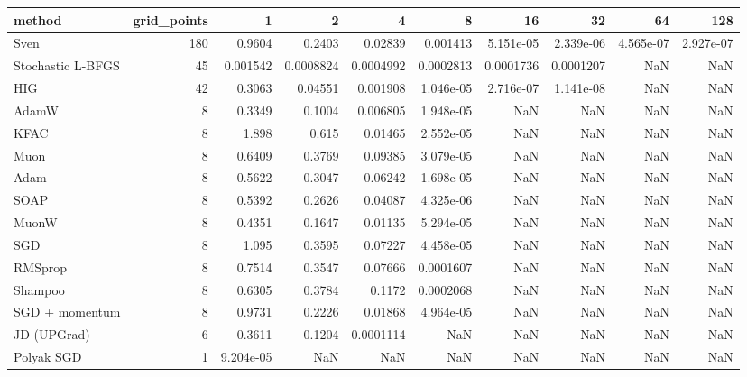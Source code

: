 \begin{tabular}{lrrrrrrrrr}
\toprule
method & grid\_points & 1 & 2 & 4 & 8 & 16 & 32 & 64 & 128 \\
\midrule
Sven & 180 & 0.9604 & 0.2403 & 0.02839 & 0.001413 & 5.151e-05 & 2.339e-06 & 4.565e-07 & 2.927e-07 \\
Stochastic L-BFGS & 45 & 0.001542 & 0.0008824 & 0.0004992 & 0.0002813 & 0.0001736 & 0.0001207 & NaN & NaN \\
HIG & 42 & 0.3063 & 0.04551 & 0.001908 & 1.046e-05 & 2.716e-07 & 1.141e-08 & NaN & NaN \\
AdamW & 8 & 0.3349 & 0.1004 & 0.006805 & 1.948e-05 & NaN & NaN & NaN & NaN \\
KFAC & 8 & 1.898 & 0.615 & 0.01465 & 2.552e-05 & NaN & NaN & NaN & NaN \\
Muon & 8 & 0.6409 & 0.3769 & 0.09385 & 3.079e-05 & NaN & NaN & NaN & NaN \\
Adam & 8 & 0.5622 & 0.3047 & 0.06242 & 1.698e-05 & NaN & NaN & NaN & NaN \\
SOAP & 8 & 0.5392 & 0.2626 & 0.04087 & 4.325e-06 & NaN & NaN & NaN & NaN \\
MuonW & 8 & 0.4351 & 0.1647 & 0.01135 & 5.294e-05 & NaN & NaN & NaN & NaN \\
SGD & 8 & 1.095 & 0.3595 & 0.07227 & 4.458e-05 & NaN & NaN & NaN & NaN \\
RMSprop & 8 & 0.7514 & 0.3547 & 0.07666 & 0.0001607 & NaN & NaN & NaN & NaN \\
Shampoo & 8 & 0.6305 & 0.3784 & 0.1172 & 0.0002068 & NaN & NaN & NaN & NaN \\
SGD + momentum & 8 & 0.9731 & 0.2226 & 0.01868 & 4.964e-05 & NaN & NaN & NaN & NaN \\
JD (UPGrad) & 6 & 0.3611 & 0.1204 & 0.0001114 & NaN & NaN & NaN & NaN & NaN \\
Polyak SGD & 1 & 9.204e-05 & NaN & NaN & NaN & NaN & NaN & NaN & NaN \\
\bottomrule
\end{tabular}
